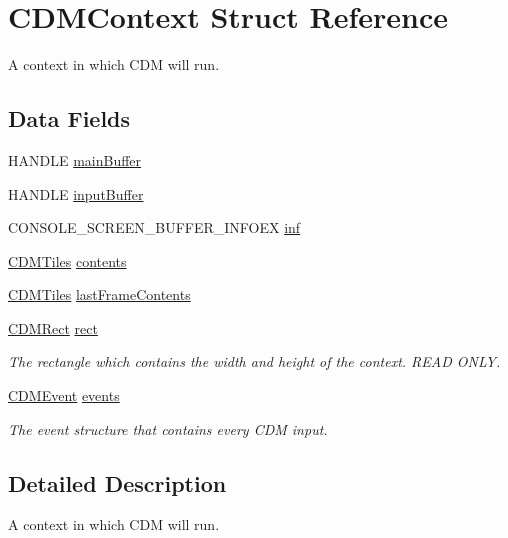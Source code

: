 \hypertarget{struct_c_d_m_context}{}\section{C\+D\+M\+Context Struct Reference}
\label{struct_c_d_m_context}


A context in which C\+DM will run.  


\subsection*{Data Fields}
\begin{DoxyCompactItemize}
\item 
H\+A\+N\+D\+LE \mbox{\hyperlink{struct_c_d_m_context_ad227f466f24fdd059e08e196f7fbab7f}{main\+Buffer}}
\item 
H\+A\+N\+D\+LE \mbox{\hyperlink{struct_c_d_m_context_adfe043e2777ad6c1ef5fc7a83b928d25}{input\+Buffer}}
\item 
C\+O\+N\+S\+O\+L\+E\+\_\+\+S\+C\+R\+E\+E\+N\+\_\+\+B\+U\+F\+F\+E\+R\+\_\+\+I\+N\+F\+O\+EX \mbox{\hyperlink{struct_c_d_m_context_a8476715d51a87d0e92e46b9be0ecd138}{inf}}
\item 
\mbox{\hyperlink{struct_c_d_m_tiles}{C\+D\+M\+Tiles}} \mbox{\hyperlink{struct_c_d_m_context_ac8c52228a53211702c5785f9c82e2f83}{contents}}
\item 
\mbox{\hyperlink{struct_c_d_m_tiles}{C\+D\+M\+Tiles}} \mbox{\hyperlink{struct_c_d_m_context_a489dca0960ee59a8f22f85c5b5fc6aed}{last\+Frame\+Contents}}
\item 
\mbox{\hyperlink{_c_d_m_8h_a23402dc2128c3c7f1e88e505a5631b9c}{C\+D\+M\+Rect}} \mbox{\hyperlink{struct_c_d_m_context_aa61e26c3b59930152cdaa0ce2dac8b14}{rect}}
\begin{DoxyCompactList}\small\item\em The rectangle which contains the width and height of the context. R\+E\+AD O\+N\+LY. \end{DoxyCompactList}\item 
\mbox{\hyperlink{struct_c_d_m_event}{C\+D\+M\+Event}} \mbox{\hyperlink{struct_c_d_m_context_ab97a0f3b9d5615487c4e542601499e94}{events}}
\begin{DoxyCompactList}\small\item\em The event structure that contains every C\+DM input. \end{DoxyCompactList}\end{DoxyCompactItemize}


\subsection{Detailed Description}
A context in which C\+DM will run. 

